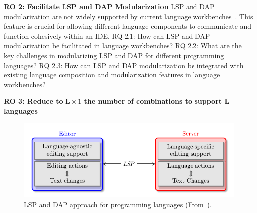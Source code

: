 \hfill \break
\noindent
\textbf{\hypertarget{ro2}{RO 2}: Facilitate LSP and DAP Modularization}
\hfill \break
LSP and DAP modularization are not widely supported by current language workbenches~\cite{Bunder19a}. This feature is crucial for allowing different language components to communicate and function cohesively within an IDE.
\hfill \break
\textsf{\hypertarget{rq21}{RQ 2.1}}: How can LSP and DAP modularization be facilitated in language workbenches?
\hfill \break
\textsf{\hypertarget{rq22}{RQ 2.2}}: What are the key challenges in modularizing LSP and DAP for different programming languages?
\hfill \break
\textsf{\hypertarget{rq23}{RQ 2.3}}: How can LSP and DAP modularization be integrated with existing language composition and modularization features in language workbenches?

\hfill \break
\noindent
\textbf{\hypertarget{ro3}{RO 3}: Reduce to $\mathbf{L} \times 1$ the number of combinations to support $\mathbf{L}$ languages}

\begin{figure}[t]
    \centering
    \includegraphics[width=0.75\linewidth]{figs/lsp_agnostic.pdf}
    \caption{LSP and DAP approach for programming languages (From~\cite{Rodriguez-Echeverria18a}).}
    \label{fig:agnostic}
\end{figure}


